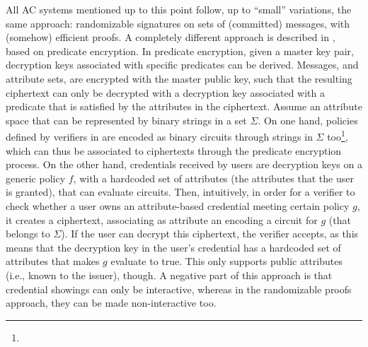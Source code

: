 All AC systems mentioned up to this point follow, up to ``small'' variations,
the same approach: randomizable signatures on sets of (committed) messages, with
(somehow) efficient proofs. A completely different approach is described in
\cite{dmm+18}, based on predicate encryption. In predicate encryption, given
a master key pair, decryption keys associated with specific predicates can be
derived. Messages, and attribute sets, are encrypted with the master public key,
such that the resulting ciphertext can only be decrypted with a decryption key
associated with a predicate that is satisfied by the attributes in the
ciphertext. Assume an attribute space that can be represented by binary strings
in a set $\Sigma$. On one hand, policies defined by verifiers in \cite{dmm+18}
are encoded
as binary circuits through strings in $\Sigma$ too\footnote{}, which can thus be associated to
ciphertexts through the predicate encryption process. On the other hand,
credentials received by users are decryption keys on a generic policy $f$, with
a hardcoded set of attributes (the attributes that the user is granted), that
can evaluate circuits. Then, intuitively, in order for a verifier to check
whether a user owns an attribute-based credential meeting certain policy $g$, it
creates a ciphertext, associating as attribute an encoding a circuit for $g$
(that belongs to $\Sigma$). If the user can decrypt this ciphertext, the
verifier accepts, as this means that the decryption key in the user's credential
has a hardcoded set of attributes that makes $g$ evaluate to true. This only
supports public attributes
(i.e., known to the issuer), though. A negative part of this approach is that
credential showings can only be interactive, whereas in the randomizable proofs
approach, they can be made non-interactive too.

